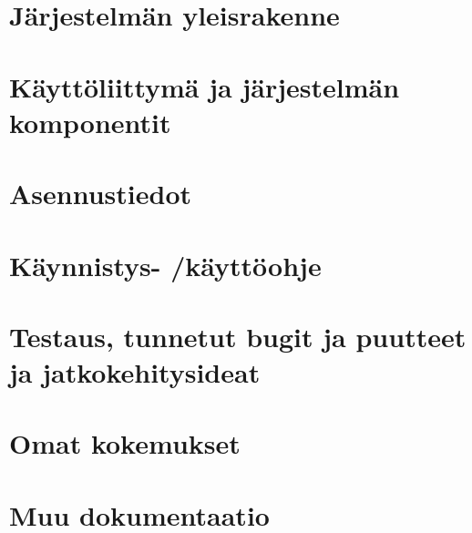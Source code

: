 \documentclass[a4paper]{article}
\begin{document}
\section{Järjestelmän yleisrakenne}
\section{Käyttöliittymä ja järjestelmän komponentit}
\section{Asennustiedot}
\section{Käynnistys- /käyttöohje}
\section{Testaus, tunnetut bugit ja puutteet ja jatkokehitysideat}
\section{Omat kokemukset}
\section{Muu dokumentaatio}
\end{document}
